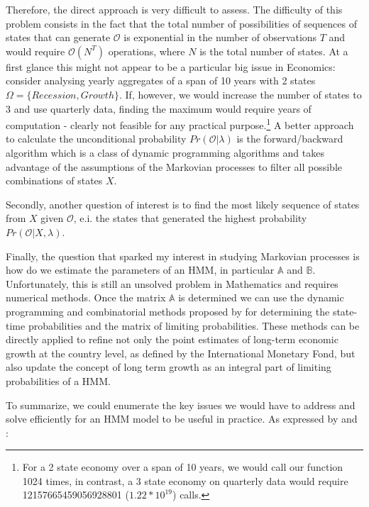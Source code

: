 \documentclass[a4paper,12pt]{article}
\theoremstyle{definition}
\begin{document}
Therefore, the direct approach is very difficult to assess. The difficulty of this problem consists in the fact that the total number of possibilities of sequences of states that can generate $\mathcal{O}$ is exponential in the number of observations $T$ and would require $\mathbf{\mathcal{O}}(N^T)$ operations, where $N$ is the total number of states. At a first glance this might not appear to be a particular big issue in Economics: consider analysing yearly aggregates of a span of 10 years with 2 states $\Omega = \{Recession, Growth\}$. If, however, we would increase the number of states to 3 and use quarterly data, finding the maximum would require years of computation - clearly not feasible for any practical purpose.\footnote{For a 2 state economy over a span of 10 years, we would call our function 1024 times, in contrast, a 3 state economy on quarterly data would require 12157665459056928801 ($1.22*10^{19}$) calls.} A better approach to calculate the unconditional probability $Pr(\mathcal{O}|\lambda)$ is the forward/backward algorithm which is a class of dynamic programming algorithms and takes advantage of the assumptions of the Markovian processes to filter all possible combinations of states $X$.

Secondly, another question of interest is to find the most likely sequence of states from $X$ given $\mathcal{O}$, e.i. the states that generated the highest probability $Pr(\mathcal{O}| X, \lambda)$.

Finally, the question that sparked my interest in studying Markovian processes is how do we estimate the parameters of an HMM, in particular $\mathbb{A}$ and $\mathbb{B}$. Unfortunately, this is still an unsolved problem in Mathematics and requires numerical methods. Once the matrix $\mathbb{A}$ is determined we can use the dynamic programming and combinatorial methods proposed by \cite{Lozovanu15} for determining the state-time probabilities and the matrix of limiting probabilities. These methods can be directly applied to refine not only the point estimates of long-term economic growth at the country level, as defined by the International Monetary Fond, but also update the concept of long term growth as an integral part of limiting probabilities of a HMM. 

To summarize, we could enumerate the key issues we would have to address and solve efficiently for an HMM model to be useful in practice. As expressed by \cite{fraser08} and \cite{hamilton02}: 
\end{document}
